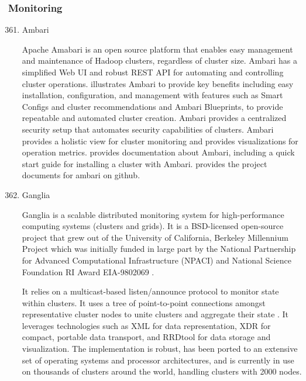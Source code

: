 \subsubsection{Monitoring}
\label{\detokenize{i524/technologies:monitoring}}\begin{enumerate}
\setcounter{enumi}{360}
\item {} 
Ambari

Apache Amabari is an open source platform that enables easy
management and maintenance of Hadoop clusters, regardless of
cluster size. Ambari has a simplified Web UI and robust REST API
for automating and controlling cluster operations.
\label{\detokenize{i524/technologies:id659}}{\hyperref[\detokenize{i524/technologies:www-hortonworks-ambari}]{\sphinxcrossref{{[}572{]}}}} illustrates Ambari to provide key
benefits including easy installation, configuration, and
management with features such as Smart Configs and cluster
recommendations and Ambari Blueprints, to provide repeatable and
automated cluster creation. Ambari provides a centralized
security setup that automates security capabilities of
clusters. Ambari provides a holistic view for cluster monitoring
and provides visualizations for operation
metrics. \label{\detokenize{i524/technologies:id660}}{\hyperref[\detokenize{i524/technologies:www-ambari}]{\sphinxcrossref{{[}573{]}}}} provides documentation about Ambari,
including a quick start guide for installing a cluster with
Ambari. \label{\detokenize{i524/technologies:id661}}{\hyperref[\detokenize{i524/technologies:www-github-ambari}]{\sphinxcrossref{{[}574{]}}}} provides the project documents
for ambari on github.

\item {} 
Ganglia

Ganglia is a scalable distributed monitoring system for
high-performance computing systems (clusters and grids). It is a
BSD-licensed open-source project that grew out of the University
of California, Berkeley Millennium Project which was initially
funded in large part by the National Partnership for Advanced
Computational Infrastructure (NPACI) and National Science
Foundation RI Award EIA-9802069 \label{\detokenize{i524/technologies:id662}}{\hyperref[\detokenize{i524/technologies:www-gms}]{\sphinxcrossref{{[}575{]}}}}.

It relies on a multicast-based listen/announce protocol to
monitor state within clusters. It uses a tree of point-to-point
connections amongst representative cluster nodes to unite
clusters and aggregate their state \label{\detokenize{i524/technologies:id663}}{\hyperref[\detokenize{i524/technologies:www-gsoft}]{\sphinxcrossref{{[}576{]}}}}. It
leverages technologies such as XML for data representation, XDR
for compact, portable data transport, and RRDtool for data
storage and visualization. The implementation is robust, has been
ported to an extensive set of operating systems and processor
architectures, and is currently in use on thousands of clusters
around the world, handling clusters with 2000 nodes.


\end{enumerate}
